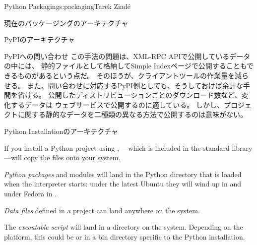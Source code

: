 \begin{aosachapter}{Python Packaging}{s:packaging}{Tarek Ziad\'{e}}
\begin{aosasect1}{現在のパッケージングのアーキテクチャ}
\begin{aosasect2}{PyPIのアーキテクチャ}
\begin{aosasect3}{PyPIへの問い合わせ}
\noindent
この手法の問題は、XML-RPC APIで公開しているデータの中には、
静的ファイルとして格納してSimple Indexページで公開することもできるものがあるという点だ。
そのほうが、クライアントツールの作業量を減らせる。
また、問い合わせに対応するPyPI側としても、そうしておけば余計な手間を省ける。
公開したディストリビューションごとのダウンロード数など、変化するデータは
ウェブサービスで公開するのに適している。
しかし、プロジェクトに関する静的なデータを二種類の異なる方法で公開するのは意味がない。

\end{aosasect3}

\end{aosasect2}

\begin{aosasect2}{Python Installationのアーキテクチャ}

If you install a Python project using ,
---which is included in the standard library---will
copy the files onto your system.

\begin{aosaitemize}

  \item \emph{Python packages} and modules will land in the Python
  directory that is loaded when the interpreter starts: under the
  latest Ubuntu they will wind up in
   and under Fedora in
  .

  \item \emph{Data files} defined in a project can land anywhere
  on the system.

  \item The \emph{executable script} will land in a  directory
  on the system. Depending on the platform, this could be
   or in a bin directory specific to the Python
  installation.


\end{aosaitemize}
\end{aosasect2}
\end{aosasect1}
\end{aosachapter}
